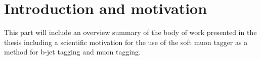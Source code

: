 \chapter{Introduction and motivation} \label{sec:introduction_and_motivation}
This part will include an overview summary of the body of work presented in the thesis including a scientific motivation for the use of the soft muon tagger as a method for b-jet tagging and muon tagging.
